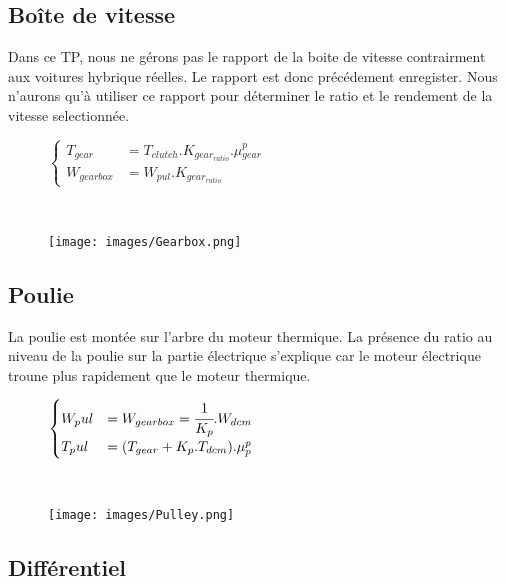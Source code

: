 \subsection{Boîte de vitesse}
Dans ce TP, nous ne gérons pas le rapport de la boite de vitesse contrairment aux voitures hybrique réelles. Le rapport est donc précédement enregister. Nous n'aurons qu'à utiliser ce rapport pour déterminer le ratio et le rendement de la vitesse selectionnée. 
\vspace{-10px}
\begin{figure}[ht]
\centering
\begin{minipage}{.5\textwidth}  
\centering
$\begin{cases}
	 T_{gear} &= T_{clutch}.K_{gear_{ratio}}.\mu{}_{gear}^{p}\\
	W_{gearbox} &= W_{pul}.K_{gear_{ratio}}
\end{cases}$
\end{minipage}~
\begin{minipage}{.5\textwidth}
  \centering
\texttt{[image: images/Gearbox.png]}
\end{minipage}
\end{figure}
\FloatBarrier
\vspace{-20px}

\newpage
\subsection{Poulie}
La poulie est montée sur l'arbre du moteur thermique. La présence du ratio au niveau de la poulie sur la partie électrique s'explique car le moteur électrique troune plus rapidement que le moteur thermique. 
\vspace{-20px}
\begin{figure}[ht]
\centering
\begin{minipage}{.5\textwidth}  
\centering
$\begin{cases}
	W_pul &= W_{gearbox} = \cfrac{1}{K_p}.W_{dcm} \\
	T_pul &= (T_{gear}+K_p.T_{dcm}).\mu{}_p^{p}
\end{cases}$
\end{minipage}~
\begin{minipage}{.5\textwidth}
  \centering
\texttt{[image: images/Pulley.png]}
\end{minipage}
\end{figure}
\FloatBarrier
\vspace{-30px}

\subsection{Différentiel}


